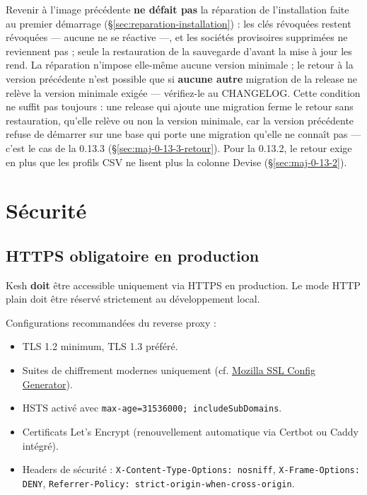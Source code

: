 \documentclass[a4paper,11pt,oneside]{article}
\begin{document}
Revenir à l'image précédente \textbf{ne défait pas} la réparation de l'installation faite au premier démarrage (\S\ref{sec:reparation-installation}) : les clés révoquées restent révoquées --- aucune ne se réactive ---, et les sociétés provisoires supprimées ne reviennent pas ; seule la restauration de la sauvegarde d'avant la mise à jour les rend. La réparation n'impose elle-même aucune version minimale ; le retour à la version précédente n'est possible que si \textbf{aucune autre} migration de la release ne relève la version minimale exigée --- vérifiez-le au CHANGELOG. Cette condition ne suffit pas toujours : une release qui ajoute une migration ferme le retour sans restauration, qu'elle relève ou non la version minimale, car la version précédente refuse de démarrer sur une base qui porte une migration qu'elle ne connaît pas --- c'est le cas de la 0.13.3 (\S\ref{sec:maj-0-13-3-retour}). Pour la 0.13.2, le retour exige en plus que les profils CSV ne lisent plus la colonne Devise (\S\ref{sec:maj-0-13-2}).

\section{Sécurité}

\subsection{HTTPS obligatoire en production}

Kesh \textbf{doit} être accessible uniquement via HTTPS en production. Le mode HTTP plain doit être réservé strictement au développement local.

Configurations recommandées du reverse proxy :

\begin{itemize}
    \item TLS 1.2 minimum, TLS 1.3 préféré.
    \item Suites de chiffrement modernes uniquement (cf. \href{https://ssl-config.mozilla.org/}{Mozilla SSL Config Generator}).
    \item HSTS activé avec \texttt{max-age=31536000; includeSubDomains}.
    \item Certificats Let's Encrypt (renouvellement automatique via Certbot ou Caddy intégré).
    \item Headers de sécurité : \texttt{X-Content-Type-Options: nosniff}, \texttt{X-Frame-Options: DENY}, \texttt{Referrer-Policy: strict-origin-when-cross-origin}.
\end{itemize}
\end{document}

